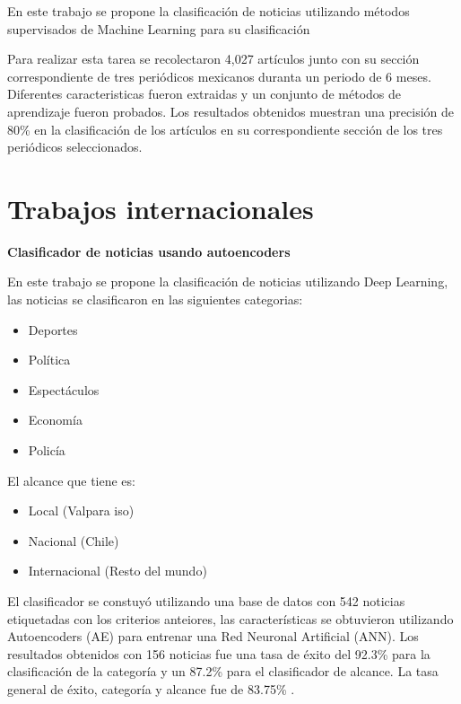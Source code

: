 En este trabajo se propone la clasificación de noticias utilizando métodos supervisados de Machine Learning para su clasificación

Para realizar esta tarea se recolectaron 4,027 artículos junto con su sección correspondiente de tres periódicos mexicanos duranta un periodo de 6 meses. Diferentes caracteristicas fueron extraidas y un conjunto de métodos de aprendizaje fueron probados. Los resultados obtenidos muestran una precisión de 80\% en la clasificación de los artículos en su correspondiente sección de los tres periódicos seleccionados\cite{cinco}.\\


\section{Trabajos internacionales}


\begin{large}
	 \textbf{Clasificador de noticias usando autoencoders}\\
\end{large}

En este trabajo se propone la clasificación de noticias utilizando Deep Learning, las noticias se clasificaron en las siguientes categorias:

\begin{itemize}
	\item Deportes
	\item Política
	\item Espectáculos
	\item Economía
	\item Policía
\end{itemize}
El alcance que tiene es:
\begin{itemize}
	\item Local (Valpara iso)
	\item Nacional (Chile)
	\item Internacional (Resto del mundo)
\end{itemize}
El clasificador se constuyó utilizando una base de datos con 542 noticias etiquetadas con los criterios anteiores, las características se obtuvieron utilizando Autoencoders (AE) para entrenar una Red Neuronal Artificial (ANN).
Los resultados obtenidos con 156 noticias fue una tasa de éxito del 92.3\% para la clasificación de la categoría y un 87.2\% para el clasificador de alcance.
La tasa general de éxito, categoría y alcance fue de 83.75\% \cite{seis}.\\

